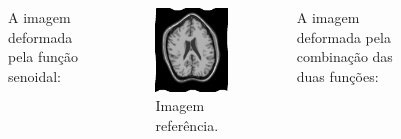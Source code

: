 \documentclass[t]{beamer}
\begin{document}
\begin{frame}
   \begin{columns}[c]
        A imagem deformada pela função senoidal:
        \begin{figure}[!h]
          \begin{center}
            \includegraphics[width=0.9\textwidth]{../images/movingImageSin.png}
            \caption{Imagem referência.}
          \end{center}
        \end{figure}
       A imagem deformada pela combinação das duas funções:
        \begin{figure}[!h]
          \begin{center}

\end{center}
\end{figure}
\end{columns}
\end{frame}
\end{document}

